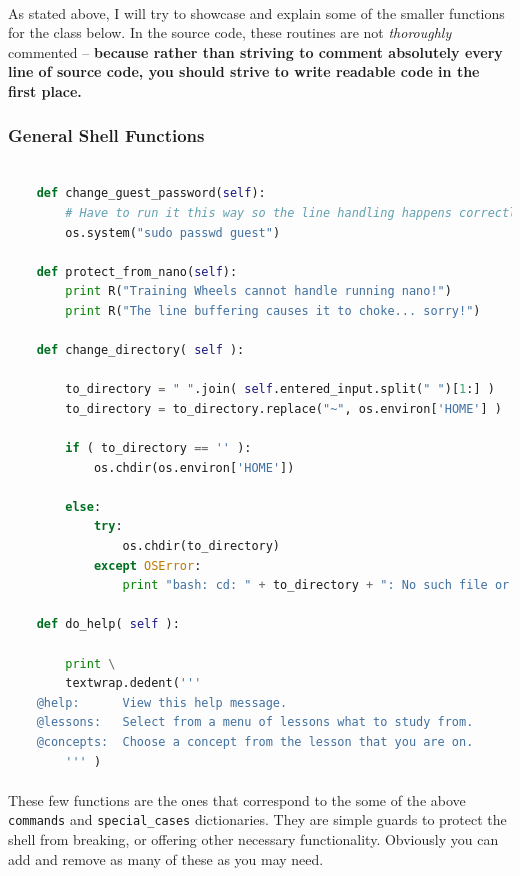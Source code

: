 \documentclass[11pt]{article}
\begin{document}
	\paragraph{}

	\hrulefill

	\paragraph{} As stated above, I will try to showcase and explain some of the smaller functions for the class below. In the source code, these routines are not \textit{thoroughly} commented -- \textbf{because rather than striving to comment absolutely every line of source code, you should strive to write readable code in the first place.}

	\subsubsection{General Shell Functions}

	\begin{lstlisting}[language=Python]
	
	def change_guest_password(self):
		# Have to run it this way so the line handling happens correctly...
		os.system("sudo passwd guest")

	def protect_from_nano(self):
		print R("Training Wheels cannot handle running nano!")
		print R("The line buffering causes it to choke... sorry!")

	def change_directory( self ):

		to_directory = " ".join( self.entered_input.split(" ")[1:] )
		to_directory = to_directory.replace("~", os.environ['HOME'] )

		if ( to_directory == '' ):
			os.chdir(os.environ['HOME'])
			
		else:
			try:
				os.chdir(to_directory)
			except OSError:
				print "bash: cd: " + to_directory + ": No such file or directory"

	def do_help( self ):

		print \
		textwrap.dedent('''
	@help:		View this help message.
	@lessons:	Select from a menu of lessons what to study from.
	@concepts:	Choose a concept from the lesson that you are on.
		''' )
	\end{lstlisting}

	\paragraph{} These few functions are the ones that correspond to the some of the above \texttt{commands} and \texttt{special\_cases} dictionaries. They are simple guards to protect the shell from breaking, or offering other necessary functionality. Obviously you can add and remove as many of these as you may need.
\end{document}
